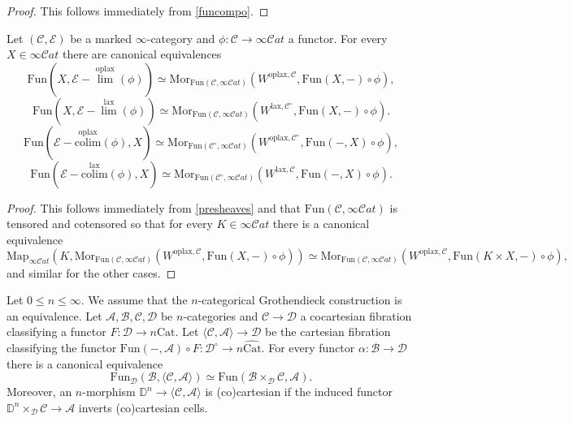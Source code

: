 \documentclass[10pt,oneside]{article}
\numberwithin{equation}{section} %
\numberwithin{figure}{section} %
\theoremstyle{plain}
\theoremstyle{definition}
\newcommand{\bD}{{\mathbb D}}
\newcommand{\mA}{{\mathcal A}}
\newcommand{\mB}{{\mathcal B}}
\newcommand{\mC}{{\mathcal C}}
\newcommand{\mD}{{\mathcal D}}
\newcommand{\mE}{{\mathcal E}}
\newcommand{\n}{{n}}
\newcommand{\colim}{\mathrm{colim}}
\newcommand{\Cat}{\mathrm{Cat}}
\newcommand{\Fun}{\mathrm{Fun}}
\newcommand{\lax}{{\mathrm{lax}}}
\newcommand{\oplax}{{\mathrm{oplax}}}
\newcommand{\Map}{{\mathrm{Map}}}
\newcommand{\Mor}{{\mathrm{Mor}}}
\newcommand{\scat}{\mathcal{C}\mathit{at}}
\begin{document}
\begin{proof}

This follows immediately from \cref{funcompo}.
\end{proof}

\begin{proposition} Let $(\mC, \mE)$ be a marked $\infty$-category and $\phi: \mC \to \infty\scat$ a functor.
For every $X \in \infty\scat$ there are canonical equivalences
$$ \Fun(X,\mE-\overset{\oplax}{\lim}(\phi)) \simeq \Mor_{\Fun(\mC, \infty\scat)}(W^{\oplax,\mC},\Fun(X,-) \circ \phi), $$
$$ \Fun(X,\mE-\overset{\lax}{\lim}(\phi)) \simeq \Mor_{\Fun(\mC, \infty\scat)}(W^{\lax,\mC^\circ},\Fun(X,-) \circ \phi). $$
$$ \Fun(\mE-\overset{\oplax}{\colim}(\phi),X) \simeq \Mor_{\Fun(\mC^\circ, \infty\scat)}(W^{\oplax,\mC^\circ},\Fun(-,X) \circ \phi), $$
$$ \Fun(\mE-\overset{\lax}{\colim}(\phi),X) \simeq \Mor_{\Fun(\mC^\circ, \infty\scat)}(W^{\lax,\mC},\Fun(-,X) \circ \phi). $$

\end{proposition}

\begin{proof}

This follows immediately from \cref{presheaves}
and that $\Fun(\mC, \infty\scat)$ is tensored and cotensored so that for every $K \in \infty\scat$ there is a canonical equivalence 
$$\Map_{\infty\scat}(K,\Mor_{\Fun(\mC, \infty\scat)}(W^{\oplax,\mC},\Fun(X,-) \circ \phi)) \simeq \Mor_{\Fun(\mC, \infty\scat)}(W^{\oplax,\mC},\Fun(K \times X,-) \circ \phi),$$
and similar for the other cases.
\end{proof}

\begin{proposition}\label{repre}

Let $0 \leq \n \leq \infty.$
We assume that the $n$-categorical Grothendieck construction is an equivalence.
Let $\mA, \mB, \mC,\mD$ be $n$-categories and $\mC \to \mD$ a cocartesian fibration classifying a functor $F: \mD \to n\Cat$.
Let $ \langle \mC, \mA \rangle \to \mD$ be the cartesian fibration classifying 
the functor $\Fun(-,\mA) \circ F: \mD^{\circ} \to n\widehat{\Cat}.$
For every functor $\alpha: \mB \to \mD$ there is a canonical equivalence
$$ \Fun_\mD(\mB, \langle \mC, \mA \rangle) \simeq \Fun(\mB\times_\mD \mC, \mA).$$
Moreover, an $n$-morphism $\bD^n \to \langle \mC, \mA \rangle$
is (co)cartesian if the induced functor 
$\bD^n \times_\mD \mC \to \mA$ inverts (co)cartesian cells. 

\end{proposition}
\end{document}
